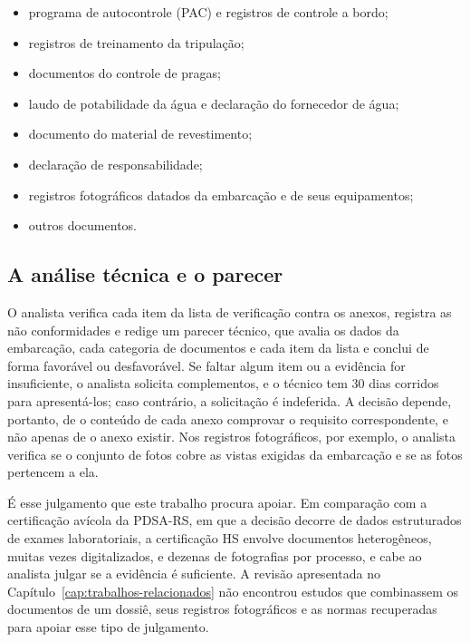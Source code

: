 \begin{itemize}
	\item programa de autocontrole (PAC) e registros de controle a bordo;
	\item registros de treinamento da tripulação;
	\item documentos do controle de pragas;
	\item laudo de potabilidade da água e declaração do fornecedor de água;
	\item documento do material de revestimento;
	\item declaração de responsabilidade;
	\item registros fotográficos datados da embarcação e de seus equipamentos;
	\item outros documentos.
\end{itemize}

\subsection{A análise técnica e o parecer}

O analista verifica cada item da lista de verificação contra os anexos, registra as não conformidades e redige um parecer técnico, que avalia os dados da embarcação, cada categoria de documentos e cada item da lista e conclui de forma favorável ou desfavorável. Se faltar algum item ou a evidência for insuficiente, o analista solicita complementos, e o técnico tem 30 dias corridos para apresentá-los; caso contrário, a solicitação é indeferida. A decisão depende, portanto, de o conteúdo de cada anexo comprovar o requisito correspondente, e não apenas de o anexo existir. Nos registros fotográficos, por exemplo, o analista verifica se o conjunto de fotos cobre as vistas exigidas da embarcação e se as fotos pertencem a ela.

É esse julgamento que este trabalho procura apoiar. Em comparação com a certificação avícola da PDSA-RS, em que a decisão decorre de dados estruturados de exames laboratoriais, a certificação HS envolve documentos heterogêneos, muitas vezes digitalizados, e dezenas de fotografias por processo, e cabe ao analista julgar se a evidência é suficiente. A revisão apresentada no Capítulo~\ref{cap:trabalhos-relacionados} não encontrou estudos que combinassem os documentos de um dossiê, seus registros fotográficos e as normas recuperadas para apoiar esse tipo de julgamento.
